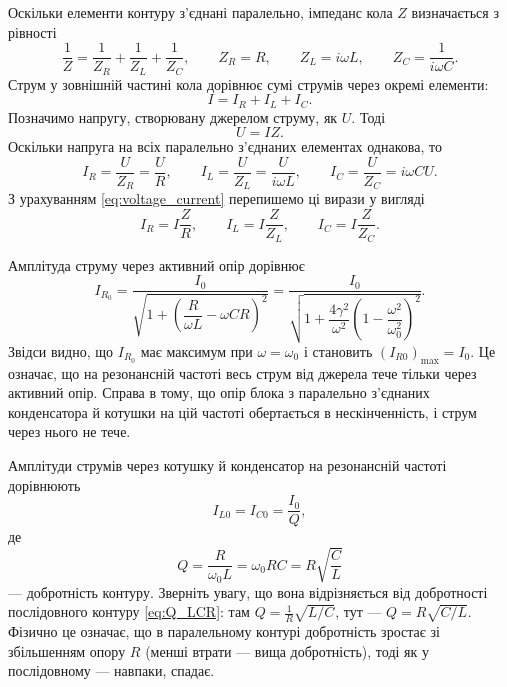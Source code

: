 Оскільки елементи контуру з'єднані паралельно, імпеданс кола $Z$ визначається з рівності
\begin{equation}\label{eq:parallel_impedance}
	\frac{1}{Z} = \frac{1}{Z_R} + \frac{1}{Z_L} + \frac{1}{Z_C}, \qquad
	Z_R = R, \qquad Z_L = i\omega L, \qquad Z_C = \frac{1}{i\omega C}.
\end{equation}
Струм у зовнішній частині кола дорівнює сумі струмів через окремі елементи:
\begin{equation}\label{eq:current_sum}
	I = I_R + I_L + I_C.
\end{equation}
Позначимо напругу, створювану джерелом струму, як $U$. Тоді
\begin{equation}\label{eq:voltage_current}
	U = IZ.
\end{equation}
Оскільки напруга на всіх паралельно з'єднаних елементах однакова, то
\begin{equation}\label{eq:branch_currents}
	I_R = \frac{U}{Z_R} = \frac{U}{R}, \qquad
	I_L = \frac{U}{Z_L} = \frac{U}{i\omega L}, \qquad
	I_C = \frac{U}{Z_C} = i\omega C U.
\end{equation}
З урахуванням \eqref{eq:voltage_current} перепишемо ці вирази у вигляді
\begin{equation}\label{eq:branch_currents_Z}
	I_R = I\frac{Z}{R}, \qquad
	I_L = I\frac{Z}{Z_L}, \qquad
	I_C = I\frac{Z}{Z_C}.
\end{equation}

Амплітуда струму через активний опір дорівнює
\begin{equation}\label{eq:IR_amplitude}
	I_{R_0} = \frac{I_0}{\sqrt{1 + \left(\dfrac{R}{\omega L} - \omega C R\right)^2}}
	= \frac{I_0}{\sqrt{1 + \dfrac{4\gamma^2}{\omega^2}\left(1 - \dfrac{\omega^2}{\omega_0^2}\right)^2}}.
\end{equation}
Звідси видно, що $I_{R_0}$ має максимум при $\omega = \omega_0$ і становить $(I_{R0})_{\max} = I_0$. Це означає, що на резонансній частоті весь струм від джерела тече тільки через активний опір. Справа в тому, що опір блока з паралельно з'єднаних конденсатора й котушки на цій частоті обертається в нескінченність, і струм через нього не тече.

Амплітуди струмів через котушку й конденсатор на резонансній частоті дорівнюють
\begin{equation}\label{eq:resonance_currents_Q}
	I_{L0} = I_{C0} = \frac{I_0}{Q},
\end{equation}
де
\begin{equation}\label{eq:Q_parallel}
	Q = \frac{R}{\omega_0 L} = \omega_0 R C = R\sqrt{\frac{C}{L}}
\end{equation}
--- добротність  контуру. Зверніть увагу, що вона відрізняється від добротності послідовного контуру \eqref{eq:Q_LCR}: там $Q = \frac{1}{R}\sqrt{L/C}$, тут --- $Q = R\sqrt{C/L}$. Фізично це означає, що в паралельному контурі добротність зростає зі збільшенням опору $R$ (менші втрати --- вища добротність), тоді як у послідовному --- навпаки, спадає.

